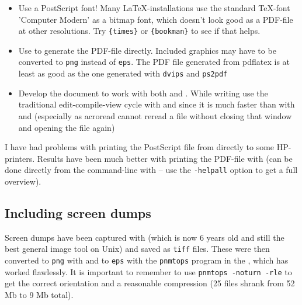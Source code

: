 \begin{itemize}
\item Use a PostScript font!  Many \LaTeX-installations use the
  standard \TeX-font 'Computer Modern' as a bitmap font, which doesn't
  look good as a PDF-file at other resolutions.   Try
  \texttt{\{times\}} or
  \texttt{\{bookman\}} to see if that helps.
\item Use  to generate the PDF-file
  directly.  Included graphics may have to be converted to
  \texttt{png} instead of \texttt{eps}.  The PDF file generated from
  pdflatex is at least as good as the one generated with
  \texttt{dvips} and \texttt{ps2pdf}
\item Develop the document to work with both  and
  .  While writing use the traditional
  edit-compile-view cycle with  and
   since it is much faster than with
   and  (especially as
  acroread cannot reread a file without closing that window and
  opening the file again)
\end{itemize}

I have had problems with printing the PostScript file from
 directly to some HP-printers.  Results have been
much better with printing the PDF-file with
 (can be done directly from the command-line with
 -- use the
\texttt{-helpall} option to get a full overview).


\subsection{Including screen dumps}
\label{sec:report-writing-tools-latex-eps}

Screen dumps have been captured with
(which is now 6 years old and still the best general image tool on
Unix) and saved as \texttt{tiff} files.  These were then converted to
\texttt{png} with  and to \texttt{eps} with the
\texttt{pnmtops} program in the 
, which has worked flawlessly.  It is important to remember
to use \texttt{pnmtops -noturn -rle} to get the correct orientation and
a reasonable compression (25 files shrank from 52 Mb to 9 Mb total).

